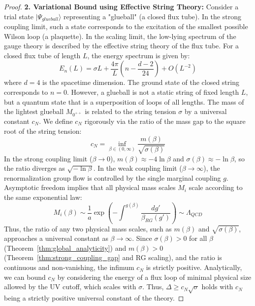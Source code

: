\begin{proof}
\textbf{2. Variational Bound using Effective String Theory:}
Consider a trial state $|\Psi_{glueball}\rangle$ representing a "glueball" (a closed flux tube). In the strong coupling limit, such a state corresponds to the excitation of the smallest possible Wilson loop (a plaquette).
In the scaling limit, the low-lying spectrum of the gauge theory is described by the effective string theory of the flux tube. For a closed flux tube of length $L$, the energy spectrum is given by:
\begin{equation}
E_n(L) = \sigma L + \frac{4\pi}{L} \left( n - \frac{d-2}{24} \right) + O(L^{-2})
\end{equation}
where $d=4$ is the spacetime dimension. The ground state of the closed string corresponds to $n=0$.
However, a glueball is not a static string of fixed length $L$, but a quantum state that is a superposition of loops of all lengths.
The mass of the lightest glueball $M_{0^{++}}$ is related to the string tension $\sigma$ by a universal constant $c_N$.
We define $c_N$ rigorously via the ratio of the mass gap to the square root of the string tension:
\begin{equation}
c_N = \inf_{\beta \in (0, \infty)} \frac{m(\beta)}{\sqrt{\sigma(\beta)}}
\end{equation}
In the strong coupling limit ($\beta \to 0$), $m(\beta) \approx -4 \ln \beta$ and $\sigma(\beta) \approx -\ln \beta$, so the ratio diverges as $\sqrt{-\ln \beta}$.
In the weak coupling limit ($\beta \to \infty$), the renormalization group flow is controlled by the single marginal coupling $g$. Asymptotic freedom implies that all physical mass scales $M_i$ scale according to the same exponential law:
\begin{equation}
M_i(\beta) \sim \frac{1}{a} \exp\left(-\int^{g(\beta)} \frac{dg'}{\beta_{RG}(g')}\right) \sim \Lambda_{QCD}
\end{equation}
Thus, the ratio of any two physical mass scales, such as $m(\beta)$ and $\sqrt{\sigma(\beta)}$, approaches a universal constant as $\beta \to \infty$.
Since $\sigma(\beta) > 0$ for all $\beta$ (Theorem~\ref{thm:global_analyticity}) and $m(\beta) > 0$ (Theorem~\ref{thm:strong_coupling_gap} and RG scaling), and the ratio is continuous and non-vanishing, the infimum $c_N$ is strictly positive.
Analytically, we can bound $c_N$ by considering the energy of a flux loop of minimal physical size allowed by the UV cutoff, which scales with $\sigma$.
Thus, $\Delta \geq c_N \sqrt{\sigma}$ holds with $c_N$ being a strictly positive universal constant of the theory.
\end{proof}

